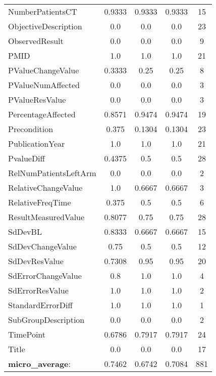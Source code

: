 \begin{longtable}{ l c c c c}
NumberPatientsCT & 0.9333 & 0.9333 & 0.9333 & 15\\
ObjectiveDescription & 0.0 & 0.0 & 0.0 & 23\\
ObservedResult & 0.0 & 0.0 & 0.0 & 9\\
PMID & 1.0 & 1.0 & 1.0 & 21\\
PValueChangeValue & 0.3333 & 0.25 & 0.25 & 8\\
PValueNumAffected & 0.0 & 0.0 & 0.0 & 3\\
PValueResValue & 0.0 & 0.0 & 0.0 & 3\\
PercentageAffected & 0.8571 & 0.9474 & 0.9474 & 19\\
Precondition & 0.375 & 0.1304 & 0.1304 & 23\\
PublicationYear & 1.0 & 1.0 & 1.0 & 21\\
PvalueDiff & 0.4375 & 0.5 & 0.5 & 28\\
RelNumPatientsLeftArm & 0.0 & 0.0 & 0.0 & 2\\
RelativeChangeValue & 1.0 & 0.6667 & 0.6667 & 3\\
RelativeFreqTime & 0.375 & 0.5 & 0.5 & 6\\
ResultMeasuredValue & 0.8077 & 0.75 & 0.75 & 28\\
SdDevBL & 0.8333 & 0.6667 & 0.6667 & 15\\
SdDevChangeValue & 0.75 & 0.5 & 0.5 & 12\\
SdDevResValue & 0.7308 & 0.95 & 0.95 & 20\\
SdErrorChangeValue & 0.8 & 1.0 & 1.0 & 4\\
SdErrorResValue & 1.0 & 1.0 & 1.0 & 2\\
StandardErrorDiff & 1.0 & 1.0 & 1.0 & 1\\
SubGroupDescription & 0.0 & 0.0 & 0.0 & 2\\
TimePoint & 0.6786 & 0.7917 & 0.7917 & 24\\
Title & 0.0 & 0.0 & 0.0 & 17\\
\textbf{micro\_average}: & 0.7462 & 0.6742 & 0.7084 & 881 
\label{tab:Glaucoma_eventextr}
\end{longtable}
